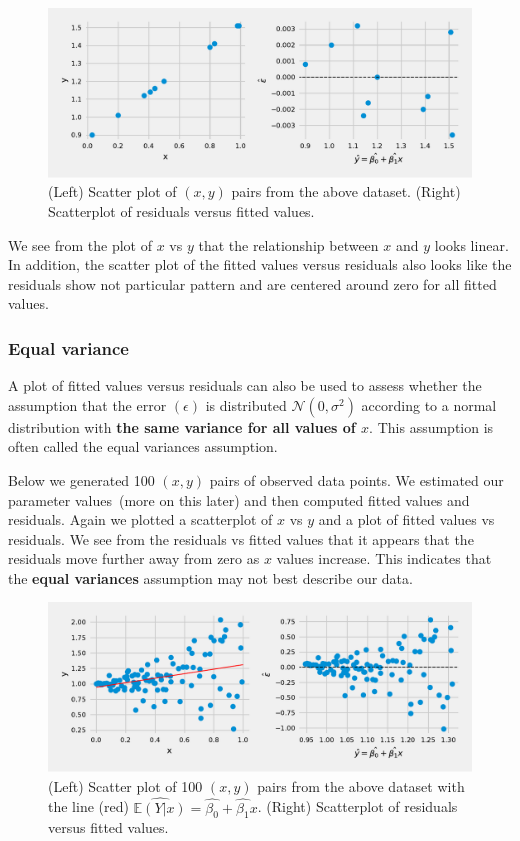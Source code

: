 \begin{figure}
    \centering
    \includegraphics[width=\textwidth]{chapters/chapter7/ch6_residuals_vs_fitted.pdf}
    \caption{(Left) Scatter plot of $(x,y)$ pairs from the above dataset.
    (Right) Scatterplot of residuals versus fitted values. \label{fig.residualsDiag}}
\end{figure}

We see from the plot of $x$ vs $y$ that the relationship between $x$ and $y$ looks linear. In addition, the scatter plot of the fitted values versus residuals also looks like the residuals show not particular pattern and are centered around zero for all fitted values.

\subsubsection{Equal variance}

A plot of fitted values versus residuals can also be used to assess whether the assumption that the error $(\epsilon)$ is distributed $\mathcal{N}(0,\sigma^{2})$ according to a normal distribution with \textbf{the same variance for all values of $x$}.
This assumption is often called the equal variances assumption.

Below we generated 100 $(x,y)$ pairs of observed data points. 
We estimated our parameter values~(more on this later) and then computed fitted values and residuals. 
Again we plotted a scatterplot of $x$ vs $y$ and a plot of fitted values vs residuals.
We see from the residuals vs fitted values that it appears that the residuals move further away from zero as $x$ values increase.
This indicates that the \textbf{equal variances} assumption may not best describe our data.

\begin{figure}
    \centering
    \includegraphics[width=\textwidth]{chapters/chapter7/ch6_residuals_vs_fitted__extravar.pdf}
    \caption{(Left) Scatter plot of 100 $(x,y)$ pairs from the above dataset with the line (red) $\hat{\mathbb{E}(Y|x)} = \hat{\beta_{0}} + \hat{\beta_{1}}x$.
    (Right) Scatterplot of residuals versus fitted values. \label{fig.residualsDiag}}
\end{figure}

